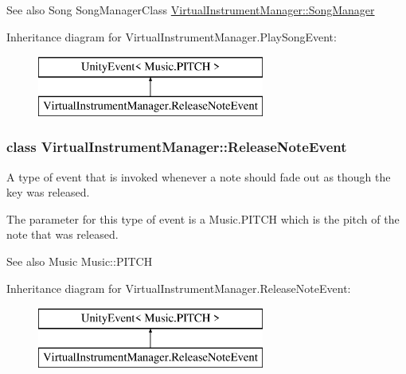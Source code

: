 \begin{DoxySeeAlso}{See also}
Song Song\+Manager\+Class \hyperlink{group___audio_management_a33dae94932c10c66db76a0eebec76b01}{Virtual\+Instrument\+Manager\+::\+Song\+Manager} 
\end{DoxySeeAlso}
Inheritance diagram for Virtual\+Instrument\+Manager.\+Play\+Song\+Event\+:\begin{figure}[H]
\begin{center}
\leavevmode
\includegraphics[height=2.000000cm]{group___event_types}
\end{center}
\end{figure}
\label{class_virtual_instrument_manager_1_1_release_note_event}
\subsubsection{class Virtual\+Instrument\+Manager\+:\+:Release\+Note\+Event}
A type of event that is invoked whenever a note should fade out as though the key was released. 

The parameter for this type of event is a Music.\+P\+I\+T\+CH which is the pitch of the note that was released.

\begin{DoxySeeAlso}{See also}
Music Music\+::\+P\+I\+T\+CH 
\end{DoxySeeAlso}
Inheritance diagram for Virtual\+Instrument\+Manager.\+Release\+Note\+Event\+:\begin{figure}[H]
\begin{center}
\leavevmode
\includegraphics[height=2.000000cm]{group___event_types}
\end{center}
\end{figure}
\label{struct_virtual_instrument_manager_1_1_echo_filter_parameters}
